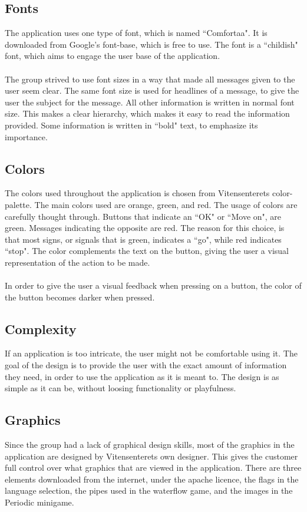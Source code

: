 \subsection{Fonts}
The application uses one type of font, which is named ``Comfortaa". It is downloaded from Google's font-base, which is free to use. The font is a ``childish" font, which aims to engage the user base of the application.
\\\\
The group strived to use font sizes in a way that made all messages given to the user seem clear. The same font size is used for headlines of a message, to give the user the subject for the message. All other information is written in normal font size. This makes a clear hierarchy, which makes it easy to read the information provided. Some information is written in ``bold" text, to emphasize its importance.

\subsection{Colors} The colors used throughout the application is chosen from Vitensenterets color-palette. The main colors used are orange, green, and red. The usage of colors are carefully thought through. Buttons that indicate an ``OK" or ``Move on", are green. Messages indicating the opposite are red. The reason for this choice, is that most signs, or signals that is green, indicates a ``go", while red indicates ``stop". The color complements the text on the button, giving the user a visual representation of the action to be made. 
\\\\
In order to give the user a visual feedback when pressing on a button, the color of the button becomes darker when pressed.

\subsection{Complexity} If an application is too intricate, the user might not be comfortable using it. The goal of the design is to provide the user with the exact amount of information they need, in order to use the application as it is meant to. The design is as simple as it can be, without loosing functionality or playfulness.

\subsection{Graphics}Since the group had a lack of graphical design skills, most of the graphics in the application are designed by Vitensenterets own designer. This gives the customer full control over what graphics that are viewed in the application. There are three elements downloaded from the internet, under the apache licence\cite{apache_licence}, the flags in the language selection, the pipes used in the waterflow game, and the images in the Periodic minigame.

